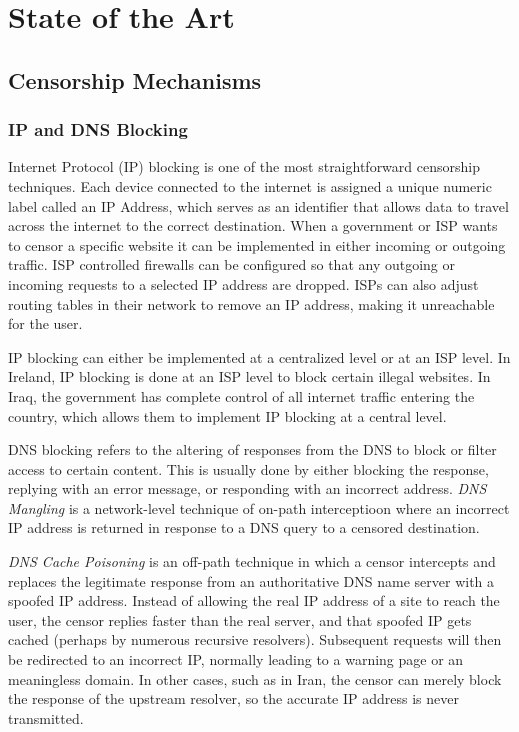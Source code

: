 \chapter{State of the Art}
\section{Censorship Mechanisms}

\subsection{IP and DNS Blocking}

Internet Protocol (IP) blocking is one of the most straightforward censorship techniques. Each device connected to the internet is assigned a unique numeric label called an IP Address, which serves as an identifier that allows data to travel across the internet to the correct destination. When a government or ISP wants to censor a specific website it can be implemented in either incoming or outgoing traffic. ISP controlled firewalls can be configured so that any outgoing or incoming requests to a selected IP address are dropped. ISPs can also adjust routing tables in their network to remove an IP address, making it unreachable for the user. 

IP blocking can either be implemented at a centralized level or at an ISP level. In Ireland, IP blocking is done at an ISP level to block certain illegal websites. In Iraq, the government has complete control of all internet traffic entering the country, which allows them to implement IP blocking at a central level.

DNS blocking refers to the altering of responses from the DNS to block or filter access to certain content. This is usually done by either blocking the response, replying with an error message, or responding with an incorrect address. \textit{DNS Mangling} is a network-level technique of on-path interceptioon where an incorrect IP address is returned in response to a DNS query to a censored destination. 

\textit{DNS Cache Poisoning} is an off-path technique in which a censor intercepts and replaces the legitimate response from an authoritative DNS name server with a spoofed IP address. Instead of allowing the real IP address of a site to reach the user, the censor replies faster than the real server, and that spoofed IP gets cached (perhaps by numerous recursive resolvers). Subsequent requests will then be redirected to an incorrect IP, normally leading to a warning page or an meaningless domain. In other cases, such as in Iran, the censor can merely block the response of the upstream resolver, so the accurate IP address is never transmitted.

